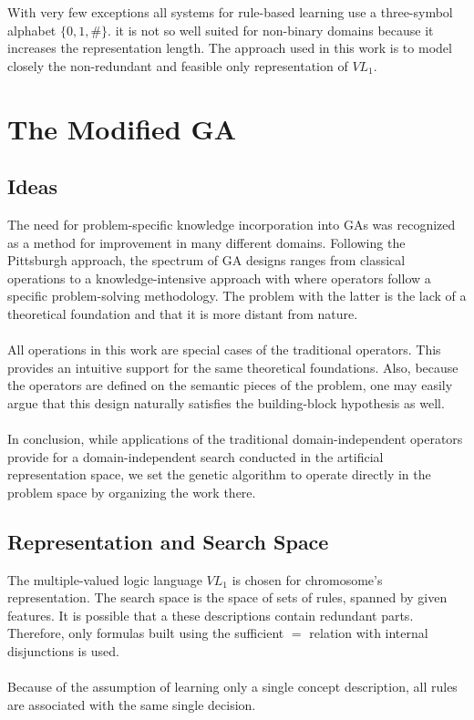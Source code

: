 \documentclass[../main.tex]{subfiles}
\begin{document}
With very few exceptions all systems for rule-based learning use a three-symbol alphabet $\{0, 1, \#\}$. it is not so
well suited for non-binary domains because it increases the representation length. The approach used in this work is to
model closely the non-redundant and feasible only representation of $VL_1$.

\section{The Modified GA}

\subsection{Ideas}
The need for problem-specific knowledge incorporation into GAs was recognized as a method for improvement in many
different domains. Following the Pittsburgh approach, the spectrum of GA designs ranges from classical operations to a
knowledge-intensive approach with where operators follow a specific problem-solving methodology. The problem with the
latter is the lack of a theoretical foundation and that it is more distant from nature.
\\\\
All operations in this work are special cases of the traditional operators. This provides an intuitive support for the
same theoretical foundations. Also, because the operators are defined on the semantic pieces of the problem, one may
easily argue that this design naturally satisfies the building-block hypothesis as well.
\\\\
In conclusion, while applications of the traditional domain-independent operators provide for a domain-independent
search conducted in the artificial representation space, we set the genetic algorithm to operate directly in the
problem space by organizing the work there.

\subsection{Representation and Search Space}
The multiple-valued logic language $VL_1$ is chosen for chromosome's representation. The search space is the space of
sets of rules, spanned by given features. It is possible that a these descriptions contain redundant parts. Therefore,
only formulas built using the sufficient $=$ relation with internal disjunctions is used.
\\\\
Because of the assumption of learning only a single concept description, all rules are associated with the same single
decision.
\end{document}
